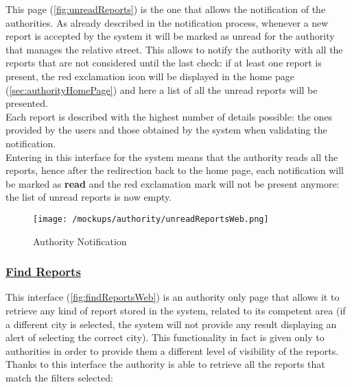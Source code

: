 				This page (\autoref{fig:unreadReports}) is the one that allows the notification of the authorities. As already described in the notification process, whenever a new report is accepted by the system it will be marked as unread for the authority that manages the relative street. This allows to notify the authority with all the reports that are not considered until the last check: if at least one report is present, the red exclamation icon will be displayed in the home page (\ref{sec:authorityHomePage}) and here a list of all the unread reports will be presented.\\
				
				Each report is described with the highest number of details possible: the ones provided by the users and those obtained by the system when validating the notification. \\
				
				Entering in this interface for the system means that the authority reads all the reports, hence after the redirection back to the home page, each notification will be marked as \textbf{read} and the red exclamation mark will not be present anymore: the list of unread reports is now empty.
				
				\newpage
				
				\begin{figure}[ht!]
					\centering
					\texttt{[image: /mockups/authority/unreadReportsWeb.png]}
					\caption{\label{fig:unreadReports} Authority Notification}
				\end{figure}
			
			\subsubsection[Find Reports]{\hyperlink{toc}{Find Reports}}
				\label{sec:authorityFindReports}
				
				This interface (\autoref{fig:findReportsWeb}) is an authority only page that allows it to retrieve any kind of report stored in the system, related to its competent area (if a different city is selected, the system will not provide any result displaying an alert of selecting the correct city). This functionality in fact is given only to authorities in order to provide them a different level of visibility of the reports.\\
				
				Thanks to this interface the authority is able to retrieve all the reports that match the filters selected:
				
